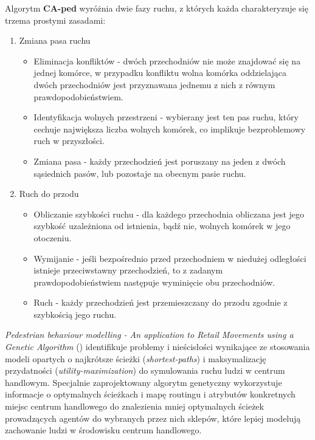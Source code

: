 \documentclass[a4paper, 12pt]{article}
\begin{document}
Algorytm \textbf{CA-ped} wyróżnia dwie fazy ruchu, z których każda charakteryzuje się trzema prostymi zasadami:

\begin{enumerate}
    \item Zmiana pasa ruchu
        \begin{itemize}
            \item Eliminacja konfliktów - dwóch przechodniów nie może znajdować się na jednej komórce, w przypadku konfliktu wolna komórka oddzielająca dwóch przechodniów jest przyznawana jednemu z nich z równym prawdopodobieństwiem.
            \item Identyfikacja wolnych przestrzeni - wybierany jest ten pas ruchu, który cechuje największa liczba wolnych komórek, co implikuje bezproblemowy ruch w przyszłości.
            \item Zmiana pasa - każdy przechodzień jest poruszany na jeden z dwóch sąsiednich pasów, lub pozostaje na obecnym pasie ruchu.
        \end{itemize}
    \item Ruch do przodu
        \begin{itemize}
          \item Obliczanie szybkości ruchu - dla każdego przechodnia obliczana jest jego szybkość uzależniona od istnienia, bądź nie, wolnych komórek w jego otoczeniu.
          \item Wymijanie - jeśli bezpośrednio przed przechodniem w niedużej odległości istnieje przeciwstawny przechodzień, to z zadanym prawdopodobieństwiem następuje wyminięcie obu przechodniów.
          \item Ruch - każdy przechodzień jest przemieszczany do przodu zgodnie z szybkością jego ruchu.
        \end{itemize}
\end{enumerate}

\emph{Pedestrian behaviour modelling - An application to Retail Movements using a Genetic Algorithm} (\cite{refs:pedestrian-behaviour-2}) identifikuje problemy i nieścisłości wynikające ze stosowania modeli opartych o najkrótsze ścieżki (\emph{shortest-paths}) i maksymalizację przydatności (\emph{utility-maximization}) do symulowania ruchu ludzi w centrum handlowym. Specjalnie zaprojektowany algorytm genetyczny wykorzystuje informacje o optymalnych ścieżkach i mapę routingu i atrybutów konkretnych miejsc centrum handlowego do znalezienia mniej optymalnych ścieżek prowadzących agentów do wybranych przez nich sklepów, które lepiej modelują zachowanie ludzi w środowisku centrum handlowego.
\end{document}
